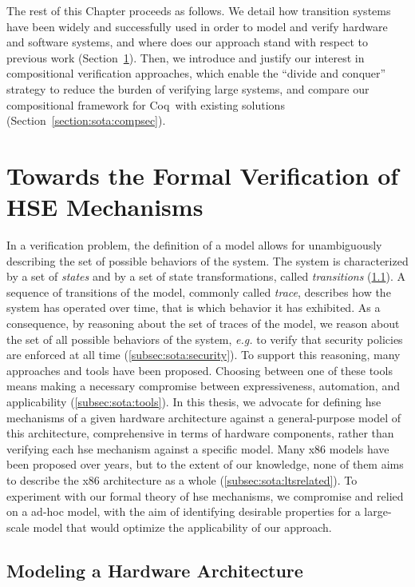 The rest of this Chapter proceeds as follows.
%
We detail how transition systems have been widely and successfully used in order
to model and verify hardware and software systems, and where does our approach
stand with respect to previous work (Section~\ref{sec:sota:formalisms}).
%
Then, we introduce and justify our interest in compositional verification
approaches, which enable the ``divide and conquer'' strategy to reduce the
burden of verifying large systems, and compare our compositional framework for
Coq\,\cite{coq} with existing solutions (Section~\ref{section:sota:compsec}).

\section{Towards the Formal Verification of HSE Mechanisms}
\label{sec:sota:formalisms}

In a verification problem, the definition of a model allows for unambiguously
describing the set of possible behaviors of the system.
%
The system is characterized by a set of \emph{states} and by a set of state
transformations, called \emph{transitions} (\ref{subsec:sota:ltsdef}).
%
A sequence of transitions of the model, commonly called \emph{trace}, describes
how the system has operated over time, that is which behavior it has exhibited.
%
As a consequence, by reasoning about the set of traces of the model, we reason
about the set of all possible behaviors of the system, \emph{e.g.} to verify
that security policies are enforced at all time (\ref{subsec:sota:security}).
%
To support this reasoning, many approaches and tools have been
proposed. Choosing between one of these tools means making a necessary
compromise between expressiveness, automation, and applicability
(\ref{subsec:sota:tools}).
%
In this thesis, we advocate for defining \ac{hse} mechanisms of a given hardware
architecture against a general-purpose model of this architecture, comprehensive
in terms of hardware components, rather than verifying each \ac{hse} mechanism
against a specific model.
%
Many x86 models have been proposed over years, but to the extent of our
knowledge, none of them aims to describe the x86 architecture as a whole
(\ref{subsec:sota:ltsrelated}).
%
To experiment with our formal theory of \ac{hse} mechanisms, we compromise and
relied on a ad-hoc model, with the aim of identifying desirable properties for a
large-scale model that would optimize the applicability of our approach.

\subsection{Modeling a Hardware Architecture}
\label{subsec:sota:ltsdef}

